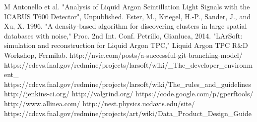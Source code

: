 \documentclass[12pt]{elsarticle}
\begin{document}
\begin{thebibliography}{99}
 M Antonello et al.  "Analysis of Liquid Argon Scintillation Light Signals with the ICARUS T600 Detector", Unpublished.
 Ester, M., Kriegel, H.-P., Sander, J., and Xu, X. 1996. "A density-based algorithm for discovering clusters in large spatial databases with noise," Proc. 2nd Int. Conf.
 Petrillo, Gianluca, 2014. "LArSoft: simulation and reconstruction for Liquid Argon TPC," Liquid Argon TPC R\&D Workshop, Fermilab.
 http://nvie.com/posts/a-successful-git-branching-model/
 https://cdcvs.fnal.gov/redmine/projects/larsoft/wiki/\_The\_developer\_environment\_
 https://cdcvs.fnal.gov/redmine/projects/larsoft/wiki/The\_rules\_and\_guidelines
 http://jenkins-ci.org/
 http://valgrind.org/
 https://code.google.com/p/gperftools/
 http://www.allinea.com/
 http://nest.physics.ucdavis.edu/site/
 https://cdcvs.fnal.gov/redmine/projects/art/wiki/Data\_Product\_Design\_Guide
\end{thebibliography}
\clearpage 
\end{document}
